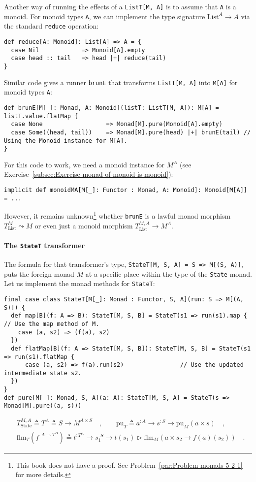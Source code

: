 Another way of running the effects of a \lstinline!ListT[M, A]! is
to assume that \lstinline!A! is a monoid. For monoid types \lstinline!A!,
we can implement the type signature $\text{List}^{A}\rightarrow A$
via the standard \lstinline!reduce! operation:
\begin{lstlisting}
def reduce[A: Monoid]: List[A] => A = {
  case Nil            => Monoid[A].empty
  case head :: tail   => head |+| reduce(tail)
}
\end{lstlisting}
Similar code gives a runner \lstinline!brunE! that transforms \lstinline!ListT[M, A]!
into \lstinline!M[A]! for monoid types \lstinline!A!:
\begin{lstlisting}
def brunE[M[_]: Monad, A: Monoid](listT: ListT[M, A]): M[A] = listT.value.flatMap {
  case None                  => Monad[M].pure(Monoid[A].empty)
  case Some((head, tail))    => Monad[M].pure(head) |+| brunE(tail) // Using the Monoid instance for M[A].
}
\end{lstlisting}
For this code to work, we need a monoid instance for $M^{A}$ (see
Exercise~\ref{subsec:Exercise-monad-of-monoid-is-monoid}):
\begin{lstlisting}
implicit def monoidMA[M[_]: Functor : Monad, A: Monoid]: Monoid[M[A]] = ...
\end{lstlisting}
However, it remains unknown\footnote{This book does not have a proof. See Problem~\ref{par:Problem-monads-5-2-1}
for more details.} whether \lstinline!brunE! is a lawful monad morphism $T_{\text{List}}^{M}\leadsto M$
or even just a monoid morphism $T_{\text{List}}^{M,A}\rightarrow M^{A}$.

\paragraph{The \texttt{StateT} transformer}

The formula for that transformer\textsf{'}s type, \lstinline!StateT[M, S, A] = S => M[(S, A)]!,
puts the foreign monad $M$ at a specific place within the type of
the \lstinline!State! monad. Let us implement the monad methods for
\lstinline!StateT!:
\begin{lstlisting}
final case class StateT[M[_]: Monad : Functor, S, A](run: S => M[(A, S)]) {
  def map[B](f: A => B): StateT[M, S, B] = StateT(s1 => run(s1).map { // Use the map method of M.
    case (a, s2) => (f(a), s2)
  })
  def flatMap[B](f: A => StateT[M, S, B]): StateT[M, S, B] = StateT(s1 => run(s1).flatMap {
      case (a, s2) => f(a).run(s2)                // Use the updated intermediate state s2.
  })
}
def pure[M[_]: Monad, S, A](a: A): StateT[M, S, A] = StateT(s => Monad[M].pure((a, s)))
\end{lstlisting}
\begin{align}
 & T_{\text{State}}^{M,A}\triangleq T^{A}\triangleq S\rightarrow M^{A\times S}\quad,\quad\quad\text{pu}_{T}\triangleq a^{:A}\rightarrow s^{:S}\rightarrow\text{pu}_{M}(a\times s)\quad,\label{eq:pure-for-stateT-transformer}\\
 & \text{flm}_{T}(f^{:A\rightarrow T^{B}})\triangleq t^{:T^{A}}\rightarrow s_{1}^{:S}\rightarrow t(s_{1})\triangleright\text{flm}_{M}(a\times s_{2}\rightarrow f(a)(s_{2}))\quad.\label{eq:flatmap-for-stateT-transformer}
\end{align}


